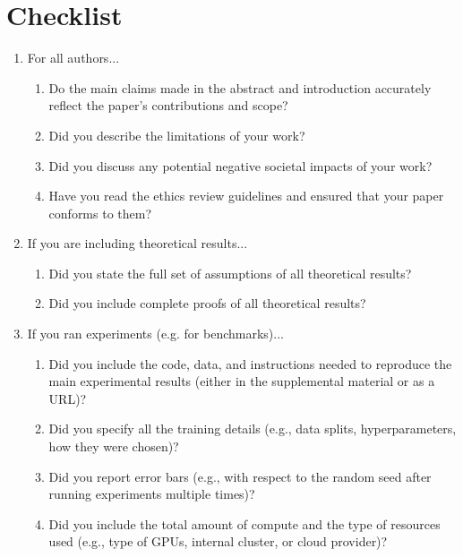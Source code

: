 \section*{Checklist}

\begin{enumerate}

\item For all authors...
\begin{enumerate}
  \item Do the main claims made in the abstract and introduction accurately reflect the paper's contributions and scope?
    \answerYes{}
  \item Did you describe the limitations of your work?
  \item Did you discuss any potential negative societal impacts of your work?
  \item Have you read the ethics review guidelines and ensured that your paper conforms to them?
    \answerYes{}
\end{enumerate}

\item If you are including theoretical results...
\begin{enumerate}
  \item Did you state the full set of assumptions of all theoretical results?
    \answerNA{}
	\item Did you include complete proofs of all theoretical results?
    \answerNA{}
\end{enumerate}

\item If you ran experiments (e.g. for benchmarks)...
\begin{enumerate}
  \item Did you include the code, data, and instructions needed to reproduce the main experimental results (either in the supplemental material or as a URL)?
  \item Did you specify all the training details (e.g., data splits, hyperparameters, how they were chosen)?
	\item Did you report error bars (e.g., with respect to the random seed after running experiments multiple times)?
    \answerNo{}
	\item Did you include the total amount of compute and the type of resources used (e.g., type of GPUs, internal cluster, or cloud provider)?
\end{enumerate}


\end{enumerate}
